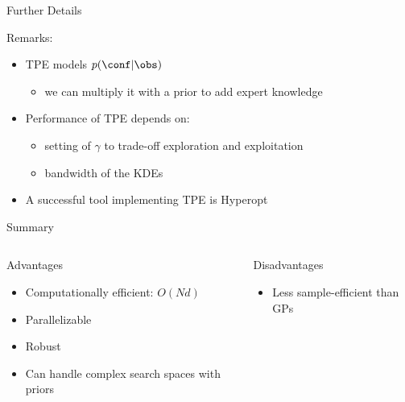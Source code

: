 \begin{frame}[c]{Further Details}

Remarks:

\begin{itemize}
	\item TPE models $p(\conf | \obs)$
	\begin{itemize}
		\item we can multiply it with a prior to add expert knowledge
	\end{itemize}
	\smallskip
	
	\pause
	
	\item Performance of TPE depends on:
	\begin{itemize}
		\item setting of $\gamma$ to trade-off exploration and exploitation
		\item bandwidth of the KDEs 
	\end{itemize}
	
	\pause
	
	\smallskip
	
	\smallskip
	\item A successful tool implementing TPE is Hyperopt 
\end{itemize}

\end{frame}
\begin{frame}[c]{Summary}

\begin{columns}[T] %
\begin{column}{.48\textwidth}
    \begin{block}{Advantages}
    \begin{itemize}
    	\item Computationally efficient: $O(Nd)$
    	\item Parallelizable
    	\item Robust
    	\item Can handle complex search spaces with priors
    \end{itemize}
    \end{block}
\end{column}%

\hfill%

\pause

\begin{column}{.48\textwidth}
    \begin{block}{Disadvantages}
    \begin{itemize}
    	\item Less sample-efficient than GPs
    \end{itemize}
    \end{block}
\end{column}
\end{columns}   

\end{frame}
